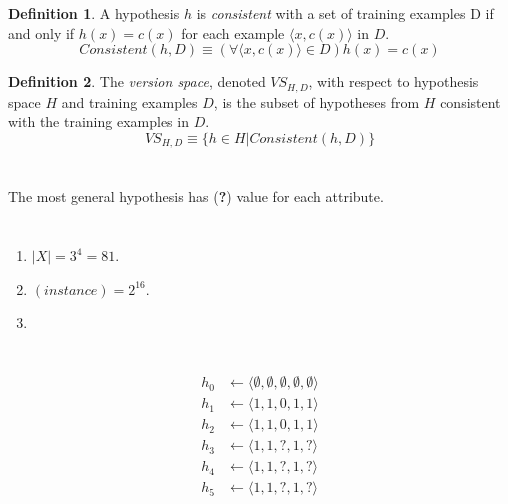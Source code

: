 \documentclass[10pt]{article}
\theoremstyle{definition}
\newtheorem{definition}{Definition}
\begin{document}
\begin{definition}
    A hypothesis $h$ is \emph{consistent} with a set of training examples D if
    and only if $h(x) = c(x)$ for each example $\langle x, c(x)\rangle$ in $D$.
    \[Consistent(h,D)\equiv(\forall\langle x,c(x)\rangle\in D) h(x)=c(x)\]
\end{definition}

\begin{definition}
    The \emph{version space}, denoted $VS_{H,D}$, with respect to hypothesis
    space $H$ and training examples $D$, is the subset of hypotheses from $H$
    consistent with the training examples in $D$.
    \[VS_{H,D}\equiv\{h\in H | Consistent(h,D)\}\]
    \end{definition}

\section{}
The most general hypothesis has (\textbf{?}) value for each attribute.

\section{}
\begin{enumerate}
    \item $|X| = 3^4 = 81$.
    \item $(instance) = 2^{16}$.
    \item 
\end{enumerate}

\section{}

\begin{align*}
    h_0 &\leftarrow \langle \emptyset, \emptyset, \emptyset, \emptyset,
    \emptyset \rangle \\
    h_1 &\leftarrow \langle 1, 1, 0, 1, 1 \rangle \\
    h_2 &\leftarrow \langle 1, 1, 0, 1, 1 \rangle \\
    h_3 &\leftarrow \langle 1, 1, ?, 1, ? \rangle \\
    h_4 &\leftarrow \langle 1, 1, ?, 1, ? \rangle \\
    h_5 &\leftarrow \langle 1, 1, ?, 1, ? \rangle
\end{align*}

\section{}
\end{document}

